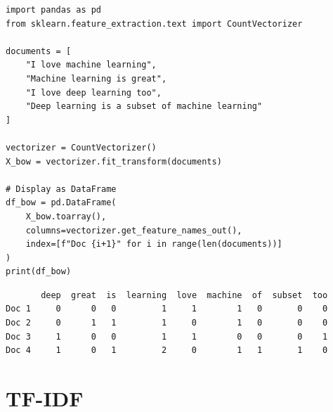\begin{center}
\end{center}

\begin{codeblock}[title=\textbf{Python}]
\begin{verbatim}
import pandas as pd
from sklearn.feature_extraction.text import CountVectorizer

documents = [
    "I love machine learning",
    "Machine learning is great",
    "I love deep learning too",
    "Deep learning is a subset of machine learning"
]

vectorizer = CountVectorizer()
X_bow = vectorizer.fit_transform(documents)

# Display as DataFrame
df_bow = pd.DataFrame(
    X_bow.toarray(),
    columns=vectorizer.get_feature_names_out(),
    index=[f"Doc {i+1}" for i in range(len(documents))]
)
print(df_bow)
\end{verbatim}
\end{codeblock}

\begin{codeoutput}
\begin{verbatim}
       deep  great  is  learning  love  machine  of  subset  too
Doc 1     0      0   0         1     1        1   0       0    0
Doc 2     0      1   1         1     0        1   0       0    0
Doc 3     1      0   0         1     1        0   0       0    1
Doc 4     1      0   1         2     0        1   1       1    0
\end{verbatim}
\end{codeoutput}

\section{TF-IDF}
\label{sec:tfidf}


